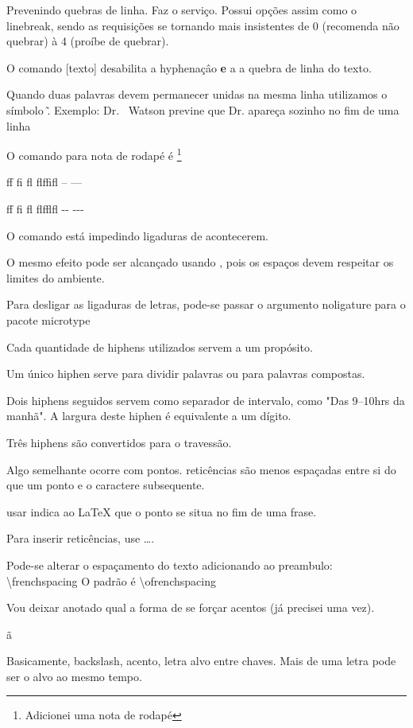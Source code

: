 \documentclass{article}
\begin{document}
Prevenindo quebras de linha.
\nolinebreak Faz o serviço.
Possui opções assim como o linebreak, sendo as requisições 
se tornando mais insistentes de 0 (recomenda não quebrar)
à 4 (proíbe de quebrar).

O comando \mbox[texto] desabilita a hyphenaçâo \textbf{e} a 
a quebra de linha do texto.

Quando duas palavras devem permanecer unidas na mesma linha utilizamos o símbolo \~.
Exemplo:
Dr. ~Watson previne que Dr. apareça sozinho no fim de uma linha

O comando para nota de rodapé é \footnote{Adicionei uma nota de rodapé}


ff fi fl flffifl -- ---

f\/f f\/i f\/l f\/l\/f\/f\/l\/f\/l -\/- -\/-\/-

O comando \/ está impedindo ligaduras de acontecerem.

O mesmo efeito pode ser alcançado usando {},
pois os espaços devem respeitar os limites do ambiente.

Para desligar as ligaduras de letras, pode-se passar o argumento noligature para o pacote microtype

Cada quantidade de hiphens utilizados servem a um propósito.

Um único hiphen serve para dividir palavras ou para palavras compostas.

Dois hiphens seguidos servem como separador de intervalo, como
"Das 9--10hrs da manhã".
A largura deste hiphen é equivalente a um dígito.

Três hiphens são convertidos para o travessão.

Algo semelhante ocorre com pontos.
reticências são menos espaçadas entre si do que um ponto 
e o caractere subsequente.

usar \@ indica ao LaTeX que o ponto se situa no fim de uma frase.

Para inserir reticências, use \ldots.

Pode-se alterar o espaçamento do texto adicionando ao preambulo:
\textbackslash frenchspacing
O padrão é \textbackslash ofrenchspacing

Vou deixar anotado qual a forma de se forçar acentos (já precisei uma vez).

\~{a}

Basicamente, backslash, acento, letra alvo entre chaves.
Mais de uma letra pode ser o alvo ao mesmo tempo.
\end{document}
